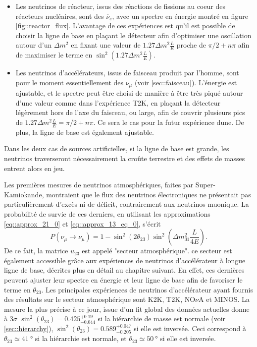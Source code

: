             \begin{itemize}
                \item Les neutrinos de réacteur, issus des réactions de fissions au coeur des réacteurs nucléaires, sont des $\overline{\nu}_e$, avec un spectre en énergie montré en figure \autoref{fig::reactor_flux}. L'avantage de ces expériences est qu'il est possible de choisir la ligne de base en plaçant le détecteur afin d'optimiser une oscillation autour d'un $\Delta m^2$ en fixant une valeur de $1.27\Delta m^2\frac{L}{E}$ proche de $\pi/2+n\pi$ afin de maximiser le terme en $\sin^2(1.27\Delta m^2\frac{L}{E})$.
                \item Les neutrinos d'accélérateurs, issus de faisceau produit par l'homme, sont pour le moment essentiellement des $\nu_{\mu}$ (voir \autoref{sec::faisceau}). L'énergie est ajustable, et le spectre peut être choisi de manière à être très piqué autour d'une valeur comme dans l'expérience T2K, en plaçant la détecteur légèrement hors de l'axe du faisceau\cite{McDonald2001}, ou large, afin de couvrir plusieurs pics de $1.27\Delta m^2\frac{L}{E}=\pi/2+n\pi$. Ce sera le cas pour la futur expérience \gls{dune}. De plus, la ligne de base est également ajustable.
            \end{itemize}
            Dans les deux cas de sources artificielles, si la ligne de base est grande, les neutrinos traverseront nécessairement la croûte terrestre et des effets de masses entrent alors en jeu.
            
            Les premières mesures de neutrinos atmosphériques, faites par Super-Kamiokande\cite{Fukuda1998}, montraient que le flux des neutrinos électroniques ne présentait pas particulièrement d'excès ni de déficit, contrairement aux neutrinos muonique. La probabilité de survie de ces derniers, en utilisant les approximations \eqref{eq::approx_21_0} et \eqref{eq::approx_13_eq_0}, s'écrit
            \begin{equation}
                P(\nu_{\mu}\to\nu_{\mu}) = 1 - \sin^2(2\theta_{23})\sin^2\left(\Delta m^2_{31}\frac{L}{4E}\right).
            \end{equation}
            De ce fait, la matrice $u_{23}$ est appelé "secteur atmosphérique". ce secteur est également accessible grâce aux expériences de neutrinos d'accélérateur à longue ligne de base, décrites plus en détail au chapitre suivant. En effet, ces dernières peuvent ajuster leur spectre en énergie et leur ligne de base afin de favoriser le terme en $\theta_{23}$. Les principales expériences de neutrinos d'accélérateur ayant fournis des résultats sur le secteur atmosphérique sont K2K\cite{ref_needed}, T2K\cite{ref_needed}, NO$\nu$A\cite{ref_needed} et MINOS\cite{ref_needed}. La mesure la plus précise à ce jour, issue d'un fit global des données actuelles donne à $3\sigma$ $\sin^2(\theta_{23})=0.425^{+0.19}_{-0.044}$\cite{pdg2018} si la hiérarchie de masse est normale (voir \autoref{sec::hierarchy}), $\sin^2(\theta_{23})=0.589^{+0.047}_{-0.205}$ si elle est inversée. Ceci correspond à $\theta_{23}\simeq\SI{41}{\degree}$ si la hiérarchie est normale, et $\theta_{23}\simeq\SI{50}{\degree}$ si elle est inversée.
            
